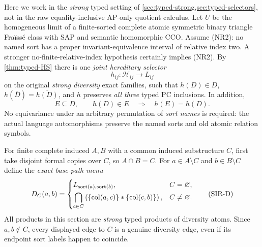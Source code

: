 Here we work in the \emph{strong} typed setting of
\cref{sec:typed-strong,sec:typed-selectors}, not in the
raw equality-inclusive AP-only quotient calculus.
Let \(U\) be the homogeneous limit of a finite-sorted
complete atomic symmetric binary triangle Fra\"iss\'e
class with SAP and semantic homomorphic CCO.
Assume (NR2): no named sort has a proper
invariant-equivalence interval of relative index two.
A stronger no-finite-relative-index hypothesis
certainly implies (NR2). By
\cref{thm:typed-HS} there is one
\emph{joint hereditary selector}
\[
 h_{ij}:\mathcal H_{ij}\longrightarrow L_{ij}
\]
on the original \emph{strong diversity} exact families,
such that \(h(D)\in D\), \(h(\bar D)=\overline{h(D)}\),
and \(h\) preserves \emph{all three} typed PC inclusions.
In addition,
\[
 E\subseteq D,\qquad h(D)\in E
       \quad\Longrightarrow\quad h(E)=h(D).
 \tag{HS}\label{eq:sir-HS}
\]
No equivariance under an arbitrary permutation
of \emph{sort names} is required: the actual
language automorphisms preserve the named sorts
and old atomic relation symbols.

For finite complete induced \(A,B\) with a
common induced substructure \(C\), first take
disjoint formal copies over \(C\), so
\(A\cap B=C\). For \(a\in A\setminus C\)
and \(b\in B\setminus C\) define the
\emph{exact base-path menu}
\[
 D_C(a,b)=
 \begin{cases}
 L_{\operatorname{sort}(a),\operatorname{sort}(b)},
       &C=\varnothing,\\[1mm]
 \displaystyle\bigcap_{c\in C}
 \left(
 \{\operatorname{col}(a,c)\}*\{\operatorname{col}(c,b)\}
 \right), &C\ne\varnothing .
 \end{cases}
 \tag{SIR-D}\label{eq:sir-base-domain}
\]
All products in this section are \emph{strong}
typed products of diversity atoms. Since
\(a,b\notin C\), every displayed edge to \(C\)
is a genuine diversity edge, even if its
endpoint sort labels happen to coincide.

